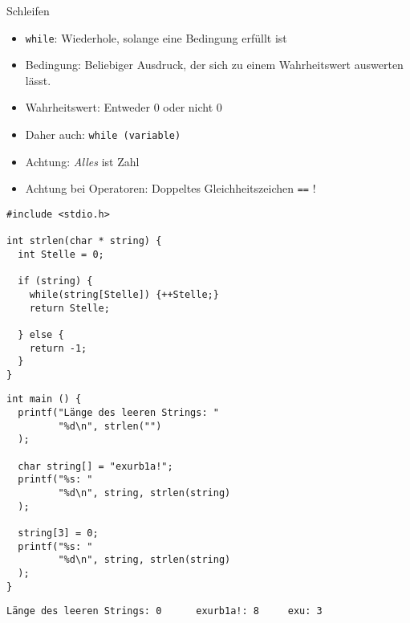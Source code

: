 
\begin{frame}[t,plain]
\titlepage
\end{frame}


\begin{frame}[fragile]{Schleifen}
%
\begin{itemize}
\item \texttt{while}: Wiederhole, solange eine Bedingung erfüllt ist
\item Bedingung: Beliebiger Ausdruck, der sich zu einem Wahrheitswert auswerten lässt.
\item Wahrheitswert: Entweder 0 oder nicht 0
\item Daher auch: \texttt{while (variable)}
\item Achtung: \emph{Alles} ist Zahl
\item Achtung bei Operatoren: Doppeltes Gleichheitszeichen \texttt{==} ! 
\end{itemize}
%
\end{frame}


\begin{frame}[fragile]
%
\begin{tcbraster}[raster columns=2, raster equal height, nobeforeafter]
%
\begin{codebox}[Beispiel: \texttt{strlen}, equal height group=A]
\begin{verbatim}
#include <stdio.h>

int strlen(char * string) {
  int Stelle = 0;
  
  if (string) {
    while(string[Stelle]) {++Stelle;}
    return Stelle;
    
  } else {
    return -1;
  }
}
\end{verbatim}
\end{codebox}
%
\begin{codebox}[...Fortsetzung, equal height group=A]
\begin{verbatim}
int main () {
  printf("Länge des leeren Strings: "
         "%d\n", strlen("")
  );
  
  char string[] = "exurb1a!";
  printf("%s: "
         "%d\n", string, strlen(string)
  );
  
  string[3] = 0;
  printf("%s: "
         "%d\n", string, strlen(string)
  );
}
\end{verbatim}
\end{codebox}
\end{tcbraster}
%
%
\begin{cmdbox}[Ausgabe]
\begin{verbatim}
Länge des leeren Strings: 0      exurb1a!: 8     exu: 3
\end{verbatim}
\end{cmdbox}
%
\end{frame}

